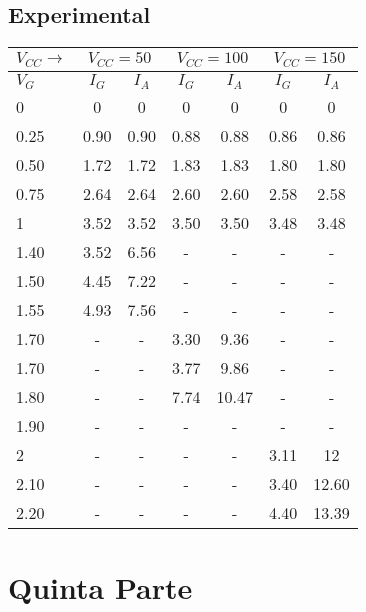 \subsection{Experimental}
\begin{table}[H]
  \begin{center}
    \begin{tabular}{|l|c|c|c|c|c|c|}
      \hline
      $V_{CC}\rightarrow$ &\multicolumn{2}{|c|}{$V_{CC}=50$} &\multicolumn{2}{c|}{$V_{CC}=100$} &\multicolumn{2}{c|}{$V_{CC}=150$} \\ 
      \hline
      \hline
      $V_{G}$ &$I_G$ &$I_A$ &$I_G$ &$I_A$  &$I_G$ &$I_A$ \\ 
      \hline
      0     &0     &0    &0    &0     &0     &0      \\
      0.25  &0.90  &0.90 &0.88 &0.88  &0.86  &0.86   \\
      0.50  &1.72  &1.72 &1.83 &1.83  &1.80  &1.80   \\
      0.75  &2.64  &2.64 &2.60 &2.60  &2.58  &2.58   \\
      1     &3.52  &3.52 &3.50 &3.50  &3.48  &3.48   \\
      1.40  &3.52  &6.56 &-    &-     &-     &-      \\
      1.50  &4.45  &7.22 &-    &-     &-     &-      \\
      1.55  &4.93  &7.56 &-    &-     &-     &-      \\
      1.70  &-     &-    &3.30 &9.36  &-     &-      \\
      1.70  &-     &-    &3.77 &9.86  &-     &-      \\
      1.80  &-     &-    &7.74 &10.47 &-     &-      \\
      1.90  &-     &-    &-    &-     &-     &-      \\
      2     &-     &-    &-    &-     &3.11  &12     \\
      2.10  &-     &-    &-    &-     &3.40  &12.60  \\
      2.20  &-     &-    &-    &-     &4.40  &13.39  \\
      \hline
    \end{tabular}
  \end{center}
\end{table}

\section{Quinta Parte}
